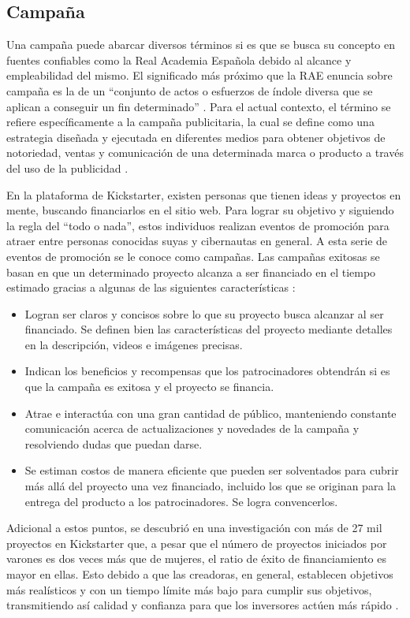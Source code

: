 \subsection{Campaña}
Una campaña puede abarcar diversos términos si es que se busca su concepto en fuentes confiables como la Real Academia Española debido al alcance y empleabilidad del mismo. El significado más próximo que la RAE enuncia sobre campaña es la de un “conjunto de actos o esfuerzos de índole diversa que se aplican a conseguir un fin determinado” \parencite{gl_rae}. Para el actual contexto, el término se refiere específicamente a la campaña publicitaria, la cual se define como una estrategia diseñada y ejecutada en diferentes medios para obtener objetivos de notoriedad, ventas y comunicación de una determinada marca o producto a través del uso de la publicidad \parencite{tec_cyberclic_campaign}.

En la plataforma de Kickstarter, existen personas que tienen ideas y proyectos en mente, buscando financiarlos en el sitio web. Para lograr su objetivo y siguiendo la regla del “todo o nada”, estos individuos realizan eventos de promoción para atraer entre personas conocidas suyas y cibernautas en general. A esta serie de eventos de promoción se le conoce como campañas. Las campañas exitosas se basan en que un determinado proyecto alcanza a ser financiado en el tiempo estimado gracias a algunas de las siguientes características \parencite{cr_kickstarter_intro}:

\begin{itemize}
	\item Logran ser claros y concisos sobre lo que su proyecto busca alcanzar al ser financiado. Se definen bien las características del proyecto mediante detalles en la descripción, videos e imágenes precisas.
	\item Indican los beneficios y recompensas que los patrocinadores obtendrán si es que la campaña es exitosa y el proyecto se financia.
	\item Atrae e interactúa con una gran cantidad de público, manteniendo constante comunicación acerca de actualizaciones y novedades de la campaña y resolviendo dudas que puedan darse.
	\item Se estiman costos de manera eficiente que pueden ser solventados para cubrir más allá del proyecto una vez financiado, incluido los que se originan para la entrega del producto a los patrocinadores. Se logra convencerlos.
\end{itemize}

Adicional a estos puntos, se descubrió en una investigación con más de 27 mil proyectos en Kickstarter que, a pesar que el número de proyectos iniciados por varones es dos veces más que de mujeres, el ratio de éxito de financiamiento es mayor en ellas. Esto debido a que las creadoras, en general, establecen objetivos más realísticos y con un tiempo límite más bajo para cumplir sus objetivos, transmitiendo así calidad y confianza para que los inversores actúen más rápido \parencite{cr_ullah2020crowdfunding}.

